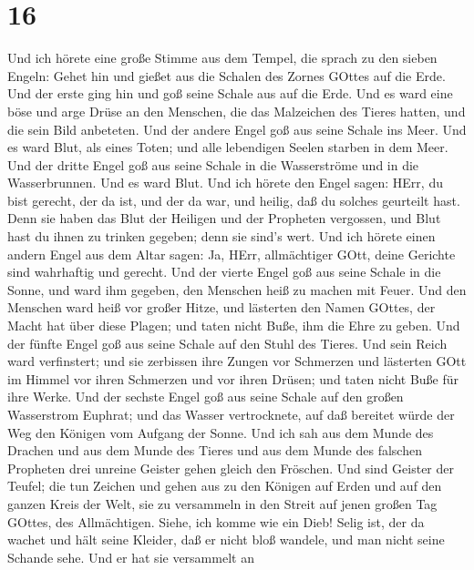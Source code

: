 \hypertarget{section-14}{%
\section{16}\label{section-14}}

 Und ich hörete eine große Stimme aus dem Tempel, die sprach
zu den sieben Engeln: Gehet hin und gießet aus die Schalen des Zornes
GOttes auf die Erde.  Und der erste ging hin und goß seine
Schale aus auf die Erde. Und es ward eine böse und arge Drüse an den
Menschen, die das Malzeichen des Tieres hatten, und die sein Bild
anbeteten.  Und der andere Engel goß aus seine Schale ins
Meer. Und es ward Blut, als eines Toten; und alle lebendigen Seelen
starben in dem Meer.  Und der dritte Engel goß aus seine
Schale in die Wasserströme und in die Wasserbrunnen. Und es ward Blut.
 Und ich hörete den Engel sagen: HErr, du bist gerecht, der
da ist, und der da war, und heilig, daß du solches geurteilt hast.
 Denn sie haben das Blut der Heiligen und der Propheten
vergossen, und Blut hast du ihnen zu trinken gegeben; denn sie sind's
wert.  Und ich hörete einen andern Engel aus dem Altar
sagen: Ja, HErr, allmächtiger GOtt, deine Gerichte sind wahrhaftig und
gerecht.  Und der vierte Engel goß aus seine Schale in die
Sonne, und ward ihm gegeben, den Menschen heiß zu machen mit Feuer.
 Und den Menschen ward heiß vor großer Hitze, und lästerten
den Namen GOttes, der Macht hat über diese Plagen; und taten nicht Buße,
ihm die Ehre zu geben.  Und der fünfte Engel goß aus seine
Schale auf den Stuhl des Tieres. Und sein Reich ward verfinstert; und
sie zerbissen ihre Zungen vor Schmerzen  und lästerten GOtt
im Himmel vor ihren Schmerzen und vor ihren Drüsen; und taten nicht Buße
für ihre Werke.  Und der sechste Engel goß aus seine Schale
auf den großen Wasserstrom Euphrat; und das Wasser vertrocknete, auf daß
bereitet würde der Weg den Königen vom Aufgang der Sonne. 
Und ich sah aus dem Munde des Drachen und aus dem Munde des Tieres und
aus dem Munde des falschen Propheten drei unreine Geister gehen gleich
den Fröschen.  Und sind Geister der Teufel; die tun Zeichen
und gehen aus zu den Königen auf Erden und auf den ganzen Kreis der
Welt, sie zu versammeln in den Streit auf jenen großen Tag GOttes, des
Allmächtigen.  Siehe, ich komme wie ein Dieb! Selig ist,
der da wachet und hält seine Kleider, daß er nicht bloß wandele, und man
nicht seine Schande sehe.  Und er hat sie versammelt an
